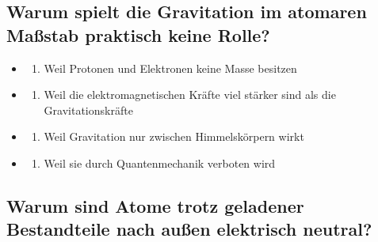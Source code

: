 \documentclass[
  11pt,
]{article}
\providecommand{\tightlist}{%
  \setlength{\itemsep}{0pt}\setlength{\parskip}{0pt}}
\begin{document}
\subsection{Warum spielt die Gravitation im atomaren Maßstab praktisch
keine
Rolle?}\label{warum-spielt-die-gravitation-im-atomaren-mauxdfstab-praktisch-keine-rolle}

\begin{itemize}
\tightlist
\item
  \begin{enumerate}
  \def\labelenumi{\Alph{enumi})}
  \tightlist
  \item
    Weil Protonen und Elektronen keine Masse besitzen\\
  \end{enumerate}
\item
  \begin{enumerate}
  \def\labelenumi{\Alph{enumi})}
  \setcounter{enumi}{1}
  \tightlist
  \item
    Weil die elektromagnetischen Kräfte viel stärker sind als die
    Gravitationskräfte\\
  \end{enumerate}
\item
  \begin{enumerate}
  \def\labelenumi{\Alph{enumi})}
  \setcounter{enumi}{2}
  \tightlist
  \item
    Weil Gravitation nur zwischen Himmelskörpern wirkt\\
  \end{enumerate}
\item
  \begin{enumerate}
  \def\labelenumi{\Alph{enumi})}
  \setcounter{enumi}{3}
  \tightlist
  \item
    Weil sie durch Quantenmechanik verboten wird
  \end{enumerate}
\end{itemize}

\subsection{Warum sind Atome trotz geladener Bestandteile nach außen
elektrisch
neutral?}\label{warum-sind-atome-trotz-geladener-bestandteile-nach-auuxdfen-elektrisch-neutral}
\end{document}
